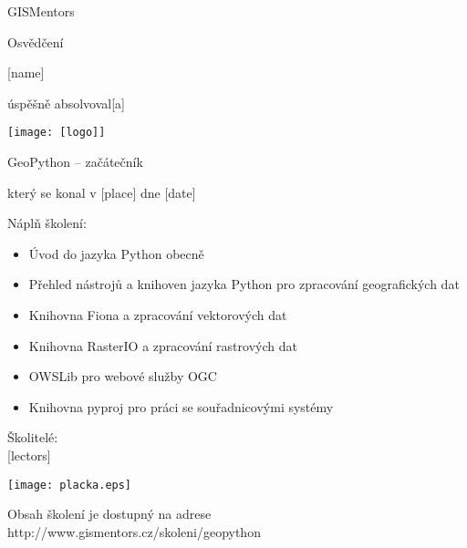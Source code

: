 \documentclass[12pt, a4paper]{letter}
\begin{document}
\pagestyle{empty}
\begin{center}

{\Large GISMentors}

{\Huge Osvědčení}

{\Large [name]}

úspěšně absolvoval[a]

\texttt{[image: [logo]]}

{\Large GeoPython -- začátečník}

který se konal v [place] dne [date]
\end{center}

Náplň školení:

\begin{itemize}
    \item Úvod do jazyka Python obecně
    \item Přehled nástrojů a knihoven jazyka Python pro zpracování geografických dat
    \item Knihovna Fiona a zpracování vektorových dat
    \item Knihovna RasterIO a zpracování rastrových dat
    \item OWSLib pro webové služby OGC
    \item Knihovna pyproj pro práci se souřadnicovými systémy
\end{itemize}

\vfill
\parbox{7cm}{

    Školitelé: \\

    [lectors]

}
\hfill
\parbox{3cm}{
    \texttt{[image: placka.eps]}
}

\vfill

\begin{center}
{\footnotesize Obsah školení je dostupný na adrese
http://www.gismentors.cz/skoleni/geopython}
\end{center}
\end{document}
